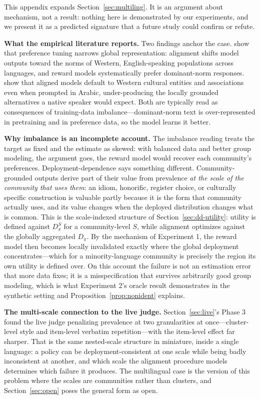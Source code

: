 ﻿\documentclass[11pt]{article}
\begin{document}
This appendix expands Section~\ref{sec:multiling}. It is an argument about mechanism, not a result: nothing here is demonstrated by our experiments, and we present it as a predicted signature that a future study could confirm or refute.

\textbf{What the empirical literature reports.} Two findings anchor the case. \citet{ryan2024} show that preference tuning narrows global representation: alignment shifts model outputs toward the norms of Western, English-speaking populations across languages, and reward models systematically prefer dominant-norm responses. \citet{naous2024} show that aligned models default to Western cultural entities and associations even when prompted in Arabic, under-producing the locally grounded alternatives a native speaker would expect. Both are typically read as consequences of training-data imbalance---dominant-norm text is over-represented in pretraining and in preference data, so the model learns it better.

\textbf{Why imbalance is an incomplete account.} The imbalance reading treats the target as fixed and the estimate as skewed: with balanced data and better group modeling, the argument goes, the reward model would recover each community's preferences. Deployment-dependence says something different. Community-grounded outputs derive part of their value from prevalence \emph{at the scale of the community that uses them}: an idiom, honorific, register choice, or culturally specific construction is valuable partly because it is the form that community actually uses, and its value changes when the deployed distribution changes what is common. This is the scale-indexed structure of Section~\ref{sec:dd-utility}: utility is defined against \(D_\pi^S\) for a community-level \(S\), while alignment optimizes against the globally aggregated \(D_\pi\). By the mechanism of Experiment 1, the reward model then becomes locally invalidated exactly where the global deployment concentrates---which for a minority-language community is precisely the region its own utility is defined over. On this account the failure is not an estimation error that more data fixes; it is a misspecification that survives arbitrarily good group modeling, which is what Experiment 2's oracle result demonstrates in the synthetic setting and Proposition~\ref{prop:nonident} explains.

\textbf{The multi-scale connection to the live judge.} Section~\ref{sec:live}'s Phase 3 found the live judge penalizing prevalence at two granularities at once---cluster-level style and item-level verbatim repetition---with the item-level effect far sharper. That is the same nested-scale structure in miniature, inside a single language: a policy can be deployment-consistent at one scale while being badly inconsistent at another, and which scale the alignment procedure models determines which failure it produces. The multilingual case is the version of this problem where the scales are communities rather than clusters, and Section~\ref{sec:open} poses the general form as open.
\end{document}
